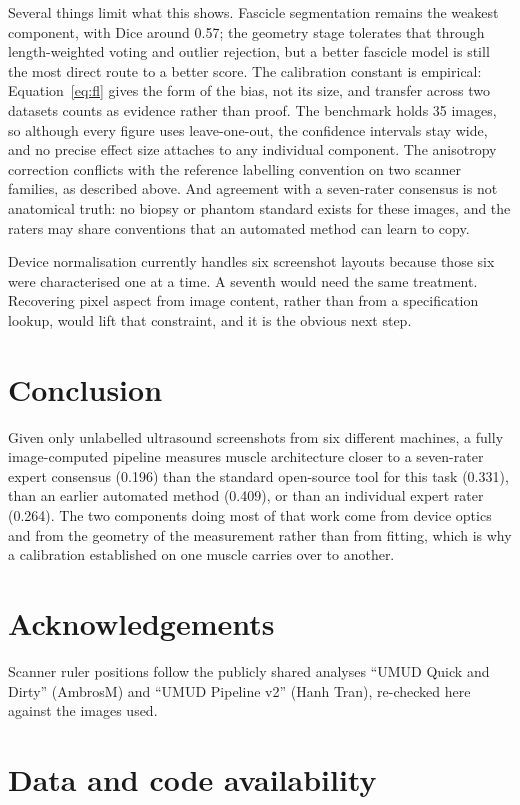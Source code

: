 \documentclass[12pt]{article}
\begin{document}
Several things limit what this shows. Fascicle segmentation remains the weakest
component, with Dice around 0.57; the geometry stage tolerates that through
length-weighted voting and outlier rejection, but a better fascicle model is
still the most direct route to a better score. The calibration constant is
empirical: Equation~\eqref{eq:fl} gives the form of the bias, not its size, and
transfer across two datasets counts as evidence rather than proof. The benchmark
holds 35 images, so although every figure uses leave-one-out, the confidence
intervals stay wide, and no precise effect size attaches to any individual
component. The anisotropy correction conflicts with the reference labelling
convention on two scanner families, as described above. And agreement with a
seven-rater consensus is not anatomical truth: no biopsy or phantom standard
exists for these images, and the raters may share conventions that an automated
method can learn to copy.

Device normalisation currently handles six screenshot layouts because those six
were characterised one at a time. A seventh would need the same treatment.
Recovering pixel aspect from image content, rather than from a specification
lookup, would lift that constraint, and it is the obvious next step.

\section{Conclusion}

Given only unlabelled ultrasound screenshots from six different machines, a
fully image-computed pipeline measures muscle architecture closer to a
seven-rater expert consensus (0.196) than the standard open-source tool for this
task (0.331), than an earlier automated method (0.409), or than an individual
expert rater (0.264). The two components doing most of that work come from
device optics and from the geometry of the measurement rather than from fitting,
which is why a calibration established on one muscle carries over to another.

\section*{Acknowledgements}

Scanner ruler positions follow the publicly shared analyses ``UMUD Quick and
Dirty'' (AmbrosM) and ``UMUD Pipeline v2'' (Hanh Tran), re-checked here against
the images used.

\section*{Data and code availability}
\end{document}

